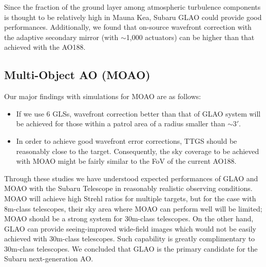 Since the fraction of the ground layer among atmospheric turbulence
components is thought to be relatively high in Mauna Kea, Subaru GLAO
could provide good performances. Additionally, we found that on-source
wavefront correction with the adaptive secondary mirror (with
$\sim$1,000 actuators) can be higher than that achieved with the AO188. 


\subsection{Multi-Object AO (MOAO)}

Our major findings with simulations for MOAO are as follows:
\begin{itemize}
 \setlength{\itemsep}{-3pt}
 \item If we use 6 GLSs, wavefront correction better than that of GLAO
       system will be achieved for those within a patrol area of a
       radius smaller than $\sim 3'$.

 \item In order to achieve good wavefront error corrections, TTGS should
       be reasonably close to the target. Consequently, the sky
       coverage to be achieved with MOAO might be fairly similar to the
       FoV of the current AO188.
\end{itemize}


Through these studies we have understood expected performances of GLAO 
and MOAO with the Subaru Telescope in reasonably realistic observing
conditions. MOAO will achieve high Strehl ratios for multiple targets,
but for the case with 8m-class telescopes, their sky area where MOAO can 
perform well will be limited; MOAO should be a strong system for
30m-class telescopes.
On the other hand, GLAO can provide seeing-improved wide-field images
which would not be easily achieved with 30m-class telescopes. Such
capability is greatly complimentary to 30m-class telescopes. We
concluded that GLAO is the primary candidate for the Subaru
next-generation AO. 

\bigskip





